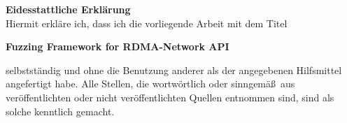 












\newpage
\begin{center}
\textbf{\Large{Eidesstattliche Erklärung}}\\
\vspace{2cm}
\color{black}
Hiermit erkläre ich, dass ich die vorliegende Arbeit mit dem Titel
\vspace{1cm}

\textbf{Fuzzing Framework for RDMA-Network API} \\
\vspace{1cm}
\color{black}
\end{center}
selbstständig und ohne die Benutzung anderer als der angegebenen Hilfsmittel angefertigt habe. Alle Stellen, die wortwörtlich oder sinngemä\ss\ aus veröffentlichten oder nicht veröffentlichten Quellen entnommen sind, sind als solche kenntlich gemacht.\\


